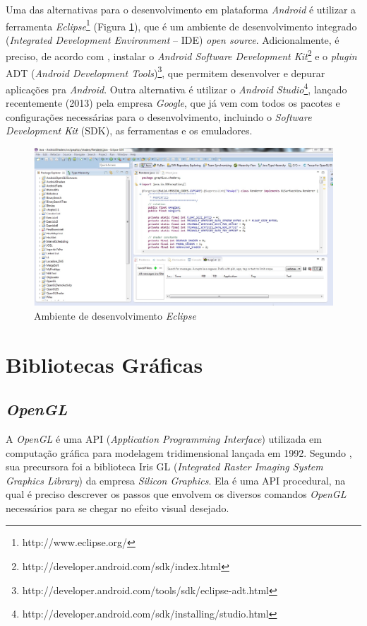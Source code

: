 	Uma das alternativas para o desenvolvimento em plataforma \textit{Android} é utilizar a ferramenta \textit{Eclipse}\footnote{http://www.eclipse.org/} (Figura \ref{eclipse}), que é um ambiente de desenvolvimento integrado (\textit{Integrated Development Environment} -- IDE) \textit{open source}. Adicionalmente, é preciso, de acordo com \cite{androidsdkmanager}, instalar o \textit{Android Software Development Kit}\footnote{http://developer.android.com/sdk/index.html} e o \textit{plugin} ADT (\textit{Android Development Tools})\footnote{http://developer.android.com/tools/sdk/eclipse-adt.html}, que permitem desenvolver e depurar aplicações pra \textit{Android}. Outra alternativa é utilizar o \textit{Android Studio}\footnote{http://developer.android.com/sdk/installing/studio.html}, lançado recentemente (2013) pela empresa \textit{Google}, que já vem com todos os pacotes e configurações necessárias para o desenvolvimento, incluindo o  \textit{Software Development Kit} (SDK), as ferramentas e os emuladores. 

	\begin{figure}[h]
	\centering
		\includegraphics[keepaspectratio=true,scale=0.45]{figuras/eclipse.jpg}
	\caption{Ambiente de desenvolvimento \textit{Eclipse}}
	\label{eclipse}
	\end{figure}

\section{Bibliotecas Gráficas}

\subsection{\textit{OpenGL}}

	A \textit{OpenGL} é uma API (\textit{Application Programming Interface}) utilizada em computação gráfica para modelagem tridimensional lançada em 1992. Segundo \cite{opengl2011}, sua precursora foi a biblioteca Iris GL (\textit{Integrated Raster Imaging System Graphics Library}) da empresa \textit{Silicon Graphics}. Ela é uma API procedural, na qual é preciso descrever os passos que envolvem os diversos comandos \textit{OpenGL} necessários para se chegar no efeito visual desejado. 

